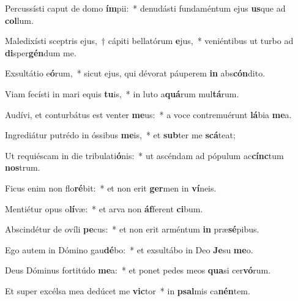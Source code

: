 \item Percussísti caput de domo \textbf{ím}pii:~* denudásti fundaméntum ejus \textbf{us}que ad \textbf{col}lum.
\item Maledixísti sceptris ejus,~† cápiti bellatórum \textbf{e}jus,~* veniéntibus ut turbo ad \textbf{di}sper\textbf{gén}dum me.
\item Exsultátio e\textbf{ó}rum,~* sicut ejus, qui dévorat páuperem \textbf{in} abs\textbf{cón}dito.
\item Viam fecísti in mari equis \textbf{tu}is,~* in luto a\textbf{quá}rum mul\textbf{tá}rum.
\item Audívi, et conturbátus est venter \textbf{me}us:~* a voce contremuérunt \textbf{lá}bia \textbf{me}a.
\item Ingrediátur putrédo in óssibus \textbf{me}is,~* et \textbf{sub}ter me \textbf{scá}teat;
\item Ut requiéscam in die tribulati\textbf{ó}nis:~* ut ascéndam ad pópulum ac\textbf{cínc}tum \textbf{nos}trum.
\item Ficus enim non flo\textbf{ré}bit:~* et non erit \textbf{ger}men in \textbf{ví}neis.
\item Mentiétur opus o\textbf{lí}væ:~* et arva non \textbf{áf}ferent \textbf{ci}bum.
\item Abscindétur de ovíli \textbf{pe}cus:~* et non erit arméntum \textbf{in} præ\textbf{sé}pibus.
\item Ego autem in Dómino gau\textbf{dé}bo:~* et exsultábo in Deo \textbf{Je}su \textbf{me}o.
\item Deus Dóminus fortitúdo \textbf{me}a:~* et ponet pedes meos \textbf{qua}si cer\textbf{vó}rum.
\item Et super excélsa mea dedúcet me \textbf{vic}tor~* in \textbf{psal}mis ca\textbf{nén}tem.
